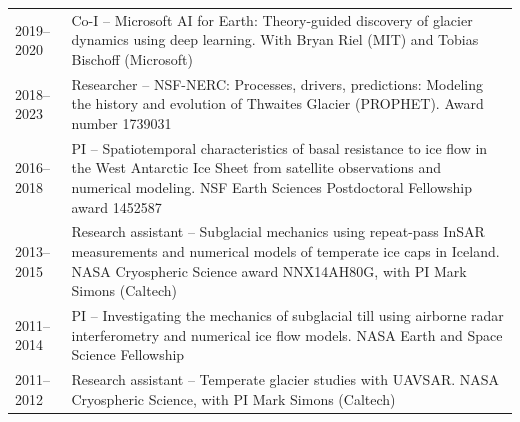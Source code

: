 \documentclass[11pt, oneside]{article}
\begin{document}
\begin{longtable}[h]{l p{14cm}}
2019--2020 & Co-I -- Microsoft AI for Earth: Theory-guided discovery of glacier dynamics using deep learning. With Bryan Riel (MIT) and Tobias Bischoff (Microsoft) \\
2018--2023 & Researcher -- NSF-NERC: Processes, drivers, predictions: Modeling the history and evolution of Thwaites Glacier (PROPHET). Award number 1739031\\
2016--2018 & PI -- Spatiotemporal characteristics of basal resistance to ice flow in the West Antarctic Ice Sheet from satellite observations and numerical modeling. NSF Earth Sciences Postdoctoral Fellowship award 1452587 \\
2013--2015 & Research assistant -- Subglacial mechanics using repeat-pass InSAR measurements and numerical models of temperate ice caps in Iceland. NASA Cryospheric Science award NNX14AH80G, with PI Mark Simons (Caltech) \\
2011--2014 & PI -- Investigating the mechanics of subglacial till using airborne radar interferometry and numerical ice flow models. NASA Earth and Space Science Fellowship \\
2011--2012 & Research assistant -- Temperate glacier studies with UAVSAR. NASA Cryospheric Science, with PI Mark Simons (Caltech)
\end{longtable}
\vspace{-5mm}
\end{document}
